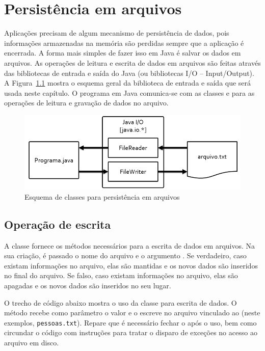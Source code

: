 \chapter{Persistência em arquivos}
	
Aplicações precisam de algum mecanismo de persistência de dados, pois informações armazenadas na memória são perdidas sempre que a aplicação é encerrada. A forma mais simples de fazer isso em Java é salvar os dados em arquivos. As operações de leitura e escrita de dados em arquivos são feitas através das bibliotecas de entrada e saída do Java (ou bibliotecas I/O – Input/Output). A Figura~\ref{fig:file-esquema} mostra o esquema geral da biblioteca de entrada e saída que será usada neste capítulo. O programa em Java comunica-se com as classes  e  para as operações de leitura e gravação de dados no arquivo.

\begin{figure}[h]
	\centering
	\includegraphics[width=0.4\textheight]{img/file-esquema}
	\caption{Esquema de classes para persistência em arquivos}
	\label{fig:file-esquema}
\end{figure}

\section{Operação de escrita}

A classe  fornece os métodos necessários para a escrita de dados em arquivos. Na sua criação, é passado o nome do arquivo e o argumento . Se verdadeiro, caso existam informações no arquivo, elas são mantidas e os novos dados são inseridos no final do arquivo. Se falso, caso existam informações no arquivo, elas são apagadas e os novos dados são inseridos no seu lugar.

O trecho de código abaixo mostra o uso da classe  para escrita de dados. O método  recebe como parâmetro o valor e o escreve no arquivo vinculado ao  (neste exemplos, \texttt{pessoas.txt}). Repare que é necessário fechar o  após o uso, bem como circundar o código com instruções  para tratar o disparo de exceções no acesso ao arquivo em disco.

